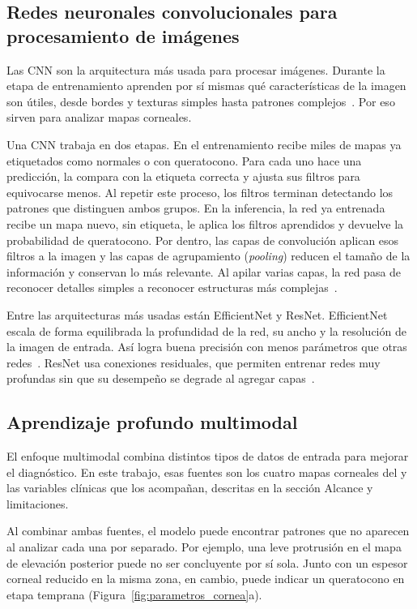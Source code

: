     \subsection{Redes neuronales convolucionales para procesamiento de imágenes}

        Las CNN son la arquitectura más usada para procesar imágenes. Durante la etapa de entrenamiento aprenden por sí mismas qué características de la imagen son útiles, desde bordes y texturas simples hasta patrones complejos~\cite{lecun_dl}. Por eso sirven para analizar mapas corneales.

        Una CNN trabaja en dos etapas. En el entrenamiento recibe miles de mapas ya etiquetados como normales o con queratocono. Para cada uno hace una predicción, la compara con la etiqueta correcta y ajusta sus filtros para equivocarse menos. Al repetir este proceso, los filtros terminan detectando los patrones que distinguen ambos grupos. En la inferencia, la red ya entrenada recibe un mapa nuevo, sin etiqueta, le aplica los filtros aprendidos y devuelve la probabilidad de queratocono. Por dentro, las capas de convolución aplican esos filtros a la imagen y las capas de agrupamiento (\textit{pooling}) reducen el tamaño de la información y conservan lo más relevante. Al apilar varias capas, la red pasa de reconocer detalles simples a reconocer estructuras más complejas~\cite{lecun_dl}.

        Entre las arquitecturas más usadas están EfficientNet y ResNet. EfficientNet escala de forma equilibrada la profundidad de la red, su ancho y la resolución de la imagen de entrada. Así logra buena precisión con menos parámetros que otras redes~\cite{efficientnet}. ResNet usa conexiones residuales, que permiten entrenar redes muy profundas sin que su desempeño se degrade al agregar capas~\cite{resnet}.

    \subsection{Aprendizaje profundo multimodal}

        El enfoque multimodal combina distintos tipos de datos de entrada para mejorar el diagnóstico. En este trabajo, esas fuentes son los cuatro mapas corneales del \Orbscan{} y las variables clínicas que los acompañan, descritas en la sección Alcance y limitaciones.

        Al combinar ambas fuentes, el modelo puede encontrar patrones que no aparecen al analizar cada una por separado. Por ejemplo, una leve protrusión en el mapa de elevación posterior puede no ser concluyente por sí sola. Junto con un espesor corneal reducido en la misma zona, en cambio, puede indicar un queratocono en etapa temprana (Figura~\ref{fig:parametros_cornea}a).

